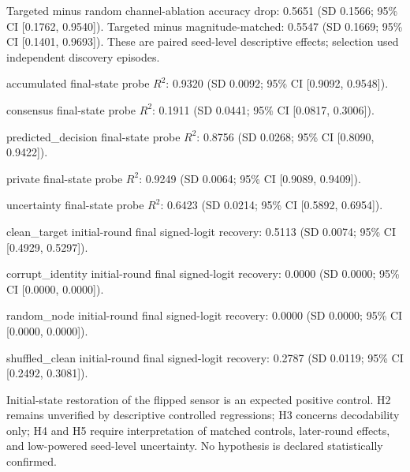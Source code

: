 Targeted minus random channel-ablation accuracy drop: 0.5651 (SD 0.1566; 95\% CI [0.1762, 0.9540]). Targeted minus magnitude-matched: 0.5547 (SD 0.1669; 95\% CI [0.1401, 0.9693]). These are paired seed-level descriptive effects; selection used independent discovery episodes.\par
accumulated final-state probe $R^2$: 0.9320 (SD 0.0092; 95\% CI [0.9092, 0.9548]).\par
consensus final-state probe $R^2$: 0.1911 (SD 0.0441; 95\% CI [0.0817, 0.3006]).\par
predicted\_decision final-state probe $R^2$: 0.8756 (SD 0.0268; 95\% CI [0.8090, 0.9422]).\par
private final-state probe $R^2$: 0.9249 (SD 0.0064; 95\% CI [0.9089, 0.9409]).\par
uncertainty final-state probe $R^2$: 0.6423 (SD 0.0214; 95\% CI [0.5892, 0.6954]).\par
clean\_target initial-round final signed-logit recovery: 0.5113 (SD 0.0074; 95\% CI [0.4929, 0.5297]).\par
corrupt\_identity initial-round final signed-logit recovery: 0.0000 (SD 0.0000; 95\% CI [0.0000, 0.0000]).\par
random\_node initial-round final signed-logit recovery: 0.0000 (SD 0.0000; 95\% CI [0.0000, 0.0000]).\par
shuffled\_clean initial-round final signed-logit recovery: 0.2787 (SD 0.0119; 95\% CI [0.2492, 0.3081]).\par
Initial-state restoration of the flipped sensor is an expected positive control. H2 remains unverified by descriptive controlled regressions; H3 concerns decodability only; H4 and H5 require interpretation of matched controls, later-round effects, and low-powered seed-level uncertainty. No hypothesis is declared statistically confirmed.

